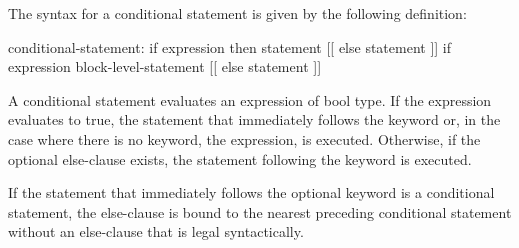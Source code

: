 The syntax for a conditional statement is given by the following
definition:
\begin{syntax}
conditional-statement:
  if expression then statement [[ else statement ]]
  if expression block-level-statement [[ else statement ]]
\end{syntax}

A conditional statement evaluates an expression of bool type.  If the
expression evaluates to true, the statement that immediately follows
the  keyword or, in the case where there is no 
keyword, the expression, is executed.  Otherwise, if the optional
else-clause exists, the statement following the  keyword is
executed.

If the statement that immediately follows the optional 
keyword is a conditional statement, the else-clause is bound to the
nearest preceding conditional statement without an else-clause that is
legal syntactically.
